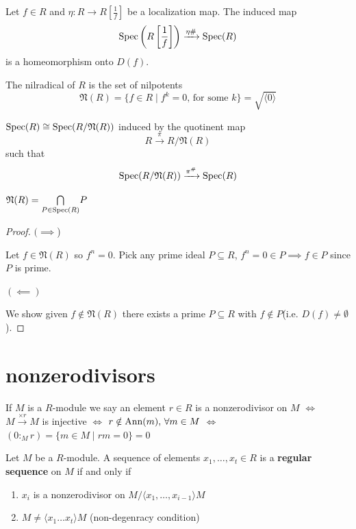 \documentclass[12pt]{amsart}
\begin{document}
\begin{theorem}
    Let $f \in R$ and $\eta: R \to R\left[\frac{1}{f}\right]$ be a localization map. The induced map 
    \[\operatorname{Spec}\left(R\left[\frac{1}{f}\right]\right) \xrightarrow{\eta \#} \operatorname{Spec}(R)\]
    is a homeomorphism onto $D(f)$. 
\end{theorem}

\begin{definition}
    The nilradical of $R$ is the set of nilpotents 
    \[\mathfrak{N}(R) = \{f \in R \mid f^k = 0, \, \text{for some } k\} = \sqrt{\langle 0 \rangle}\]
\end{definition}

\begin{proposition}
    $\operatorname{Spec}(R) \cong \operatorname{Spec}(R/\mathfrak{N}(R))$ induced by the quotinent map 
    \[R \xrightarrow{\pi} R/\mathfrak{N}(R)\] such that 
    \[\operatorname{Spec}(R/\mathfrak{N}(R)) \xrightarrow{\pi^\#} \operatorname{Spec}(R)\]
\end{proposition}

\begin{proposition}
    $\mathfrak{N}(R) = \underset{P \in \operatorname{Spec}(R)}{\bigcap}{P}$
\end{proposition}

\begin{proof}
    $(\implies$)

    Let $f \in \mathfrak{N}(R)$ so $f^n = 0$. Pick any prime ideal $P \subseteq R$, $f^n = 0 \in P \implies f \in P$ since $P$ is prime. 

    $(\impliedby)$ 

    We show given $f \notin \mathfrak{N}(R)$ there exists a prime $P \subseteq R$ with $f \notin P$(i.e. $D(f) \neq \emptyset$). 
\end{proof}

\newpage 

\section{nonzerodivisors}

\begin{remark}
    If $M$ is a $R$-module we say an element $r \in R$ is a nonzerodivisor on $M$  $\iff$ $M \xrightarrow{\times r} M$ is injective $\iff$ $r \notin \operatorname{\text{Ann}}(m), \, \forall m \in M$ $\iff$ $(0:_M r) = \{m \in M \mid rm =0\} = 0$
\end{remark}

\begin{definition}
    Let $M$ be a $R$-module. A sequence of elements $x_1, \ldots, x_t \in R$ is a \textbf{regular sequence} on $M$ if and only if 
    \begin{enumerate}
        \item $x_i$ is a nonzerodivisor on $M /\langle x_1, \ldots, x_{i-1} \rangle M$
        \item $M \neq \langle x_1 \ldots x_t \rangle M$ (non-degenracy condition)
    \end{enumerate}
\end{definition}
\end{document}
